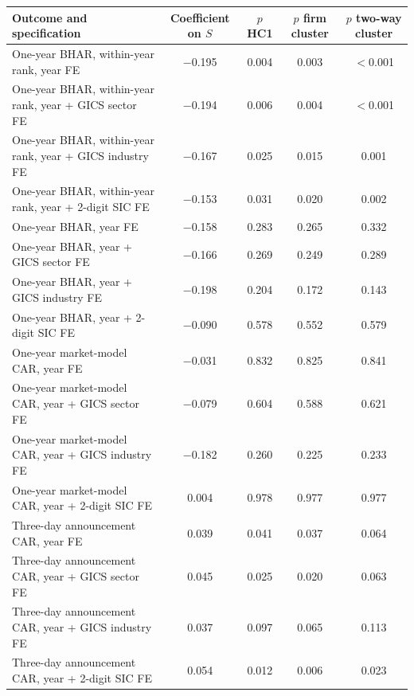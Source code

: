 \begin{tabular}{lcccc}
\toprule
Outcome and specification & Coefficient on $S$ & $p$ HC1 & $p$ firm cluster & $p$ two-way cluster \\
\midrule
One-year BHAR, within-year rank, year FE & $-$0.195 & 0.004 & 0.003 & $<$0.001 \\
One-year BHAR, within-year rank, year + GICS sector FE & $-$0.194 & 0.006 & 0.004 & $<$0.001 \\
One-year BHAR, within-year rank, year + GICS industry FE & $-$0.167 & 0.025 & 0.015 & 0.001 \\
One-year BHAR, within-year rank, year + 2-digit SIC FE & $-$0.153 & 0.031 & 0.020 & 0.002 \\
One-year BHAR, year FE & $-$0.158 & 0.283 & 0.265 & 0.332 \\
One-year BHAR, year + GICS sector FE & $-$0.166 & 0.269 & 0.249 & 0.289 \\
One-year BHAR, year + GICS industry FE & $-$0.198 & 0.204 & 0.172 & 0.143 \\
One-year BHAR, year + 2-digit SIC FE & $-$0.090 & 0.578 & 0.552 & 0.579 \\
One-year market-model CAR, year FE & $-$0.031 & 0.832 & 0.825 & 0.841 \\
One-year market-model CAR, year + GICS sector FE & $-$0.079 & 0.604 & 0.588 & 0.621 \\
One-year market-model CAR, year + GICS industry FE & $-$0.182 & 0.260 & 0.225 & 0.233 \\
One-year market-model CAR, year + 2-digit SIC FE & 0.004 & 0.978 & 0.977 & 0.977 \\
Three-day announcement CAR, year FE & 0.039 & 0.041 & 0.037 & 0.064 \\
Three-day announcement CAR, year + GICS sector FE & 0.045 & 0.025 & 0.020 & 0.063 \\
Three-day announcement CAR, year + GICS industry FE & 0.037 & 0.097 & 0.065 & 0.113 \\
Three-day announcement CAR, year + 2-digit SIC FE & 0.054 & 0.012 & 0.006 & 0.023 \\
\bottomrule
\end{tabular}
